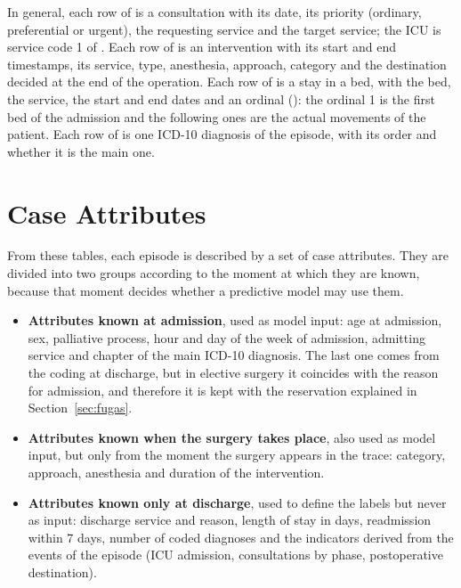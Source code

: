 In general, each row of  is a consultation with its date, its priority (ordinary, preferential or urgent), the requesting service and the target service; the ICU is service code 1 of . Each row of  is an intervention with its start and end timestamps, its service, type, anesthesia, approach, category and the destination decided at the end of the operation. Each row of  is a stay in a bed, with the bed, the service, the start and end dates and an ordinal (): the ordinal 1 is the first bed of the admission and the following ones are the actual movements of the patient. Each row of  is one ICD-10 diagnosis of the episode, with its order and whether it is the main one.

\section{Case Attributes}
\label{sec:atributos}

From these tables, each episode is described by a set of case attributes. They are divided into two groups according to the moment at which they are known, because that moment decides whether a predictive model may use them.

\begin{itemize}[leftmargin=*]
  \item \textbf{Attributes known at admission}, used as model input: age at admission, sex, palliative process, hour and day of the week of admission, admitting service and chapter of the main ICD-10 diagnosis. The last one comes from the coding at discharge, but in elective surgery it coincides with the reason for admission, and therefore it is kept with the reservation explained in Section~\ref{sec:fugas}.
  \item \textbf{Attributes known when the surgery takes place}, also used as model input, but only from the moment the surgery appears in the trace: category, approach, anesthesia and duration of the intervention.
  \item \textbf{Attributes known only at discharge}, used to define the labels but never as input: discharge service and reason, length of stay in days, readmission within 7 days, number of coded diagnoses and the indicators derived from the events of the episode (ICU admission, consultations by phase, postoperative destination).
\end{itemize}

